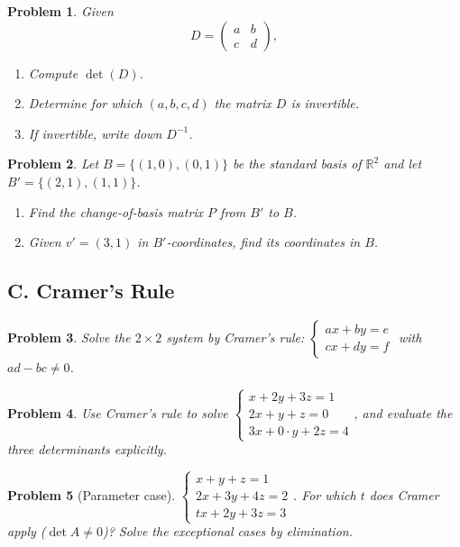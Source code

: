 \documentclass[11pt]{article}
\theoremstyle{upright}
\newtheorem{problem}{Problem}
\begin{document}
\begin{problem}
Given
\[
D =
\begin{pmatrix}
a & b \\
c & d
\end{pmatrix},
\]
\begin{enumerate}
    \item Compute $\det(D)$.
    \item Determine for which $(a,b,c,d)$ the matrix $D$ is invertible.
    \item If invertible, write down $D^{-1}$.
\end{enumerate}
\end{problem}

\begin{problem}
Let $B = \{(1,0), (0,1)\}$ be the standard basis of $\mathbb{R}^2$ and let
$B' = \{(2,1), (1,1)\}$.
\begin{enumerate}
    \item Find the change-of-basis matrix $P$ from $B'$ to $B$.
    \item Given $v' = (3,1)$ in $B'$-coordinates, find its coordinates in $B$.
\end{enumerate}
\end{problem}
\subsection*{C. Cramer’s Rule}
\begin{problem}
Solve the $2\times2$ system by Cramer’s rule:
$\begin{cases} ax+by=e\\ cx+dy=f\end{cases}$ with $ad-bc\neq 0$.
\end{problem}

\begin{problem}
Use Cramer’s rule to solve
$\begin{cases}
x+2y+3z=1\\
2x+y+z=0\\
3x+0\cdot y+2z=4
\end{cases}$,
and evaluate the three determinants explicitly.
\end{problem}

\begin{problem}[Parameter case]
$\begin{cases}
x+y+z=1\\
2x+3y+4z=2\\
tx+2y+3z=3
\end{cases}$.
For which $t$ does Cramer apply ($\det A\neq 0$)? Solve the exceptional cases by elimination.
\end{problem}
\end{document}
